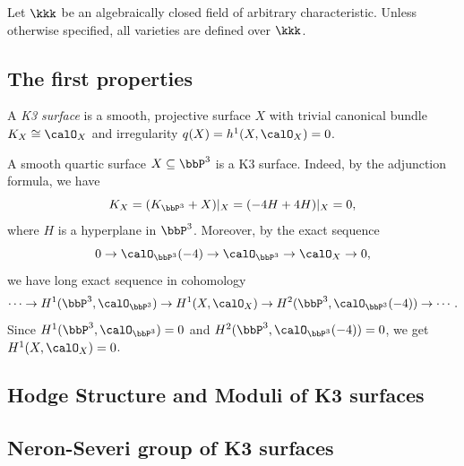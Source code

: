 Let \(\kkk\) be an algebraically closed field of arbitrary characteristic.
Unless otherwise specified, all varieties are defined over \(\kkk\).


\subsection{The first properties}

    \begin{definition}\label{def:K3_surface}
        A \emph{K3 surface} is a smooth, projective surface \(X\) with trivial canonical bundle \(K_X\cong \calO_X\) and irregularity \(q(X)=h^1(X,\calO_X)=0\).
    \end{definition}

    \begin{example}\label{ex:quartic_in_P3_is_K3}
        A smooth quartic surface \(X\subseteq \bbP^3\) is a K3 surface.
        Indeed, by the adjunction formula, we have
        \[
            K_X = (K_{\bbP^3} + X)|_X = (-4H + 4H)|_X = 0,
        \]
        where \(H\) is a hyperplane in \(\bbP^3\).
        Moreover, by the exact sequence
        \[
            0 \to \calO_{\bbP^3}(-4) \to \calO_{\bbP^3} \to \calO_X \to 0,
        \]
        we have long exact sequence in cohomology
        \[
            \cdots \to H^1(\bbP^3,\calO_{\bbP^3}) \to H^1(X,\calO_X) \to H^2(\bbP^3,\calO_{\bbP^3}(-4)) \to \cdots.
        \]
        Since \(H^1(\bbP^3,\calO_{\bbP^3})=0\) and \(H^2(\bbP^3,\calO_{\bbP^3}(-4))=0\), we get \(H^1(X,\calO_X)=0\).
    \end{example}

\subsection{Hodge Structure and Moduli of K3 surfaces}


\subsection{Neron-Severi group of K3 surfaces}


